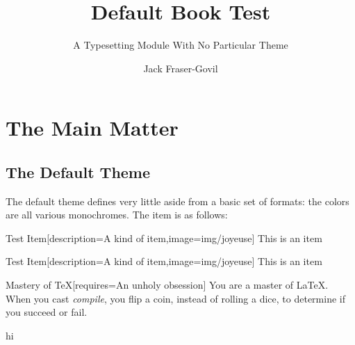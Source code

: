 \documentclass[theme=default,size=10pt,columns=2]{rpgbook}
\title{Default Book Test}
\subtitle{A Typesetting Module With No Particular Theme}
\author{Jack Fraser-Govil}
\begin{document}
	

	\part{The Main Matter}
		\chapter{The Default Theme}

			The default theme defines very little aside from a basic set of formats: the colors are all various monochromes. The item is as follows:
			\begin{RpgItem}{Test Item}[description=A kind of item,image={img/joyeuse}]
				This is an item
			\end{RpgItem}

			\begin{RpgItem}{Test Item}[description=A kind of item,image={img/joyeuse}]
				This is an item
			\end{RpgItem}

			\begin{RpgFeat}{Mastery of \TeX}[requires={An unholy obsession}]
				You are a master of \LaTeX. When you cast \textit{compile}, you flip a coin, instead of rolling a dice, to determine if you succeed or fail.
			\end{RpgFeat}

			\begin{RpgFiligree}
				hi
			\end{RpgFiligree}
\end{document}

